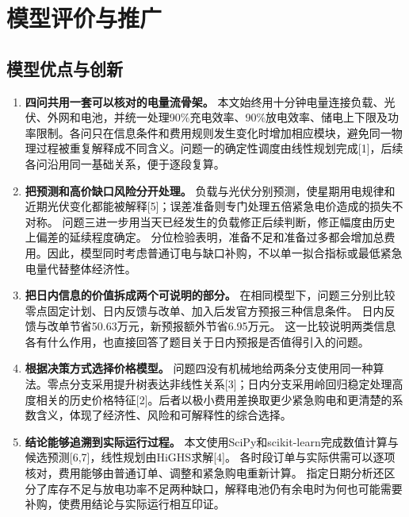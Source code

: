 \section{模型评价与推广}

\subsection{模型优点与创新}

\begin{enumerate}
    \item \textbf{四问共用一套可以核对的电量流骨架。}
    本文始终用十分钟电量连接负载、光伏、外网和电池，并统一处理90\%充电效率、90\%放电效率、储电上下限及功率限制。各问只在信息条件和费用规则发生变化时增加相应模块，避免同一物理过程被重复解释成不同含义。问题一的确定性调度由线性规划完成[1]，后续各问沿用同一基础关系，便于逐段复算。

    \item \textbf{把预测和高价缺口风险分开处理。}
    负载与光伏分别预测，使星期用电规律和近期光伏变化都能被解释[5]；误差准备则专门处理五倍紧急电价造成的损失不对称。
    问题三进一步用当天已经发生的负载修正后续判断，修正幅度由历史上偏差的延续程度确定。
    分位检验表明，准备不足和准备过多都会增加总费用。因此，模型同时考虑普通订电与缺口补购，不以单一拟合指标或最低紧急电量代替整体经济性。

    \item \textbf{把日内信息的价值拆成两个可说明的部分。}
    在相同模型下，问题三分别比较零点固定计划、日内反馈与改单、加入后发官方预报三种信息条件。
    日内反馈与改单节省50.63万元，新预报额外节省6.95万元。
    这一比较说明两类信息各有什么作用，也直接回答了题目关于日内预报是否值得引入的问题。

    \item \textbf{根据决策方式选择价格模型。}
    问题四没有机械地给两条分支使用同一种算法。零点分支采用提升树表达非线性关系[3]；日内分支采用岭回归稳定处理高度相关的历史价格特征[2]。后者以极小费用差换取更少紧急购电和更清楚的系数含义，体现了经济性、风险和可解释性的综合选择。

    \item \textbf{结论能够追溯到实际运行过程。}
    本文使用SciPy和scikit-learn完成数值计算与候选预测[6,7]，线性规划由HiGHS求解[4]。
    各时段订单与实际供需可以逐项核对，费用能够由普通订单、调整和紧急购电重新计算。
    指定日期分析还区分了库存不足与放电功率不足两种缺口，解释电池仍有余电时为何也可能需要补购，使费用结论与实际运行相互印证。
\end{enumerate}


